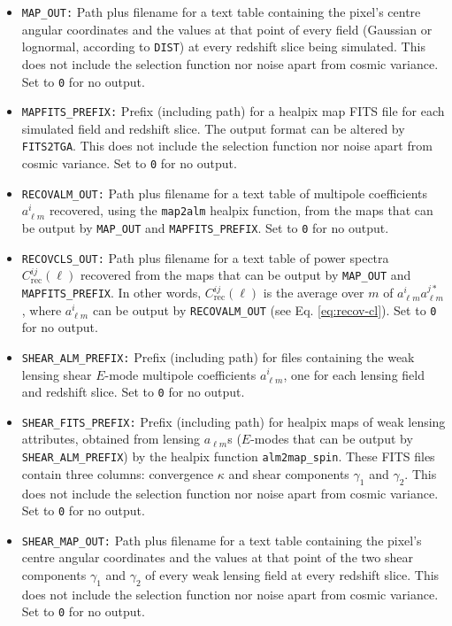 \documentclass[12pt]{book} %
\newcommand{\nv}[1]{\mathrm{#1}}                 %
\begin{document}
\begin{itemize}
\item {\tt MAP\_OUT:} Path plus filename for a text table containing the pixel's centre angular 
  coordinates and the values at that point of every field (Gaussian or lognormal, according to 
  {\tt DIST}) at every redshift slice being simulated. This does not include the selection function 
  nor noise apart from cosmic variance. Set to {\tt 0} for no output. 

\item {\tt MAPFITS\_PREFIX:} Prefix (including path) for a {\sc healpix} map FITS file for each 
  simulated field and redshift slice. The output format can be altered by {\tt FITS2TGA}. This does not include 
  the selection function nor noise apart from cosmic variance. Set to {\tt 0} for no output. 
  
\item {\tt RECOVALM\_OUT:} Path plus filename for a text table of multipole coefficients 
  $a^{i}_{\ell m}$ recovered, using the {\tt map2alm} {\sc healpix} function, 
  from the maps that can be output by {\tt MAP\_OUT} and 
  {\tt MAPFITS\_PREFIX}. Set to {\tt 0} for no output. 

\item {\tt RECOVCLS\_OUT:} Path plus filename for a text table of power spectra 
  $C_{\nv{rec}}^{ij}(\ell)$ recovered from the maps that can be output by {\tt MAP\_OUT} and 
  {\tt MAPFITS\_PREFIX}. In other words, $C_{\nv{rec}}^{ij}(\ell)$ is the average over $m$ 
  of $a^{i}_{\ell m}a^{j*}_{\ell m}$, where $a^{i}_{\ell m}$ can be output by {\tt RECOVALM\_OUT} (see Eq. \ref{eq:recov-cl}). 
  Set to {\tt 0} for no output. 

\item {\tt SHEAR\_ALM\_PREFIX:} Prefix (including path) for files containing the weak lensing 
  shear $E$-mode multipole coefficients $a^{i}_{\ell m}$, one for each lensing field and redshift 
  slice. Set to {\tt 0} for no output. 

\item {\tt SHEAR\_FITS\_PREFIX:} Prefix (including path) for {\sc healpix} maps 
  of weak lensing attributes, obtained from lensing $a_{\ell m}$s ($E$-modes that can be 
  output by {\tt SHEAR\_ALM\_PREFIX}) by the {\sc healpix} function {\tt alm2map\_spin}. 
  These FITS files contain three columns: convergence $\kappa$ and shear components 
  $\gamma_1$ and $\gamma_2$. This does not include the selection function nor noise apart 
  from cosmic variance. Set to {\tt 0} for no output. 

\item {\tt SHEAR\_MAP\_OUT:} Path plus filename for a text table containing the pixel's 
  centre angular coordinates and the values at that point of the two shear components  
  $\gamma_1$ and $\gamma_2$ of every weak lensing field at every redshift slice. 
  This does not include the selection function nor noise apart from cosmic variance. 
  Set to {\tt 0} for no output. 


\end{itemize}
\end{document}
